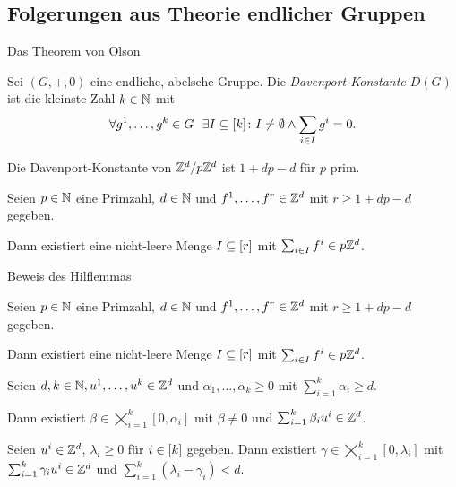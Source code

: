 \subsection{Folgerungen aus Theorie endlicher Gruppen}

\begin{frame}{Das Theorem von Olson}
	\renewcommand{\thisthmnumber}{2.3}
	\begin{defi}
		Sei $(G,+,0)$ eine endliche, abelsche Gruppe.
		Die {\em Davenport-Konstante $D(G)$} ist die kleinste Zahl $k\in\mathbb{N}$ mit 
		$$
		\forall g^1,\dots,g^k \in G~~\exists I\subseteq[k]\colon I\neq\emptyset \wedge \sum_{i\in I}g^i=0 .
		$$
	\end{defi}

	\renewcommand{\thisthmnumber}{2.6}
	\begin{thm}[Olson, 1969]
		Die Davenport-Konstante von $\mathbb{Z}^d/p\mathbb{Z}^d$ ist $1+dp-d$ für $p$ prim.
	\end{thm}

	\pause
	\renewcommand{\thisthmnumber}{2.7}
	\begin{korollar}
		Seien $p\in\mathbb{N}$ eine Primzahl, $d\in\mathbb{N}$ und $f^1,\dots,f^r\in\mathbb{Z}^d$ mit $r\geq 1+dp-d$ gegeben.
		
		Dann existiert eine nicht-leere Menge $I\subseteq[r]$ mit $\sum_{i\in I}f^i\in p\mathbb{Z}^d$.
	\end{korollar}
\end{frame}

\begin{frame}{Beweis des Hilflemmas}
\renewcommand{\thisthmnumber}{2.7}
\begin{korollar}
Seien $p\in\mathbb{N}$ eine Primzahl, $d\in\mathbb{N}$ und $f^1,\dots,f^r\in\mathbb{Z}^d$ mit $r\geq 1+dp-d$ gegeben.

Dann existiert eine nicht-leere Menge $I\subseteq[r]$ mit $\sum_{i\in I}f^i\in p\mathbb{Z}^d$.
\end{korollar}
\renewcommand{\thisthmnumber}{2.8}
\begin{lem}\label{lem:olson}
	Seien $d,k\in\mathbb{N}, u^1,\dots, u^k\in\mathbb{Z}^d$ und $\alpha_1,\dots,\alpha_k\geq0$ mit $\sum_{i=1}^k \alpha_i\geq d$.
	
	Dann existiert $\beta\in\bigtimes_{i=1}^k[0,\alpha_i]$ mit $\beta\neq0$ und $\sum_{i=1}^k\beta_i u^i \in\mathbb{Z}^d$.
\end{lem}
\pause
\renewcommand{\thisthmnumber}{2.9}
\begin{lem}\label{lem:maxgamma}
	Seien $u^i\in\mathbb{Z}^d$, $\lambda_i\geq0$ für $i\in[k]$ gegeben.
	Dann existiert $\gamma\in\bigtimes_{i=1}^k [0,\lambda_i]$ mit $\sum_{i=1}^k \gamma_i u^i\in\mathbb{Z}^d$ und  $\sum_{i=1}^k(\lambda_i-\gamma_i)<d$.
\end{lem}
\end{frame}